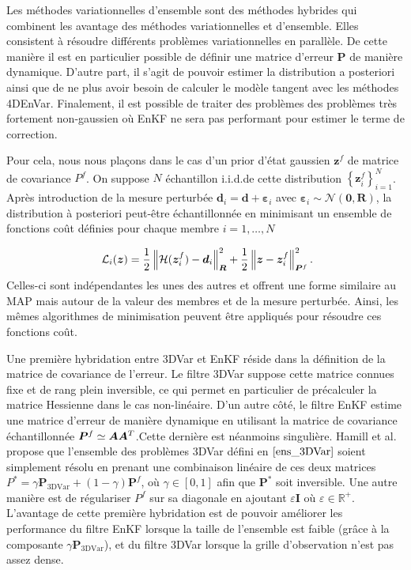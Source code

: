 Les méthodes variationnelles d'ensemble sont des méthodes hybrides qui combinent les avantage des méthodes variationnelles et d'ensemble. Elles consistent à résoudre différents problèmes variationnelles en parallèle. De cette manière il est en particulier possible de définir une matrice d'erreur $\bm P$ de manière dynamique. D'autre part, il s'agit de pouvoir estimer la distribution a posteriori ainsi que de ne plus avoir besoin de calculer le modèle tangent avec les méthodes 4DEnVar. Finalement, il est possible de traiter des problèmes des problèmes très fortement non-gaussien où EnKF ne sera pas performant pour estimer le terme de correction.

Pour cela, nous nous plaçons dans le cas d'un prior d'état gaussien $\bm z^f$ de matrice de covariance $P^f$. On suppose $N$ échantillon i.i.d.de cette distribution $\left\{\bm z^f_i\right\}_{i=1}^N$. Après introduction de la mesure perturbée $\bm d_i = \bm d + \bm \varepsilon_i$ avec $\bm \varepsilon_i \sim \mathcal{N}(\bm 0, \bm R)$, la distribution à posteriori peut-être échantillonnée en minimisant un ensemble de fonctions coût définies pour chaque membre $i = 1, \dots, N$

\begin{equation}~\label{ens_3DVar}
    \mathcal L_i(\bm z) = \frac12 \left\lVert \mathcal H (\bm z^f_i) - \bm d_i \right\rVert_{\bm R}^2 + \frac12 \left\lVert \bm z -\bm z^f_i \right\rVert^2_{\bm P^f}.
\end{equation}
Celles-ci sont indépendantes les unes des autres et offrent une forme similaire au MAP mais autour de la valeur des membres et de la mesure perturbée. Ainsi, les mêmes algorithmes de minimisation peuvent être appliqués pour résoudre ces fonctions coût.

Une première hybridation entre 3DVar et EnKF réside dans la définition de la matrice de covariance de l'erreur. Le filtre 3DVar suppose cette matrice connues fixe et de rang plein inversible, ce qui permet en particulier de précalculer la matrice Hessienne dans le cas non-linéaire. D'un autre côté, le filtre EnKF estime une matrice d'erreur de manière dynamique en utilisant la matrice de covariance échantillonnée $\bm P^f\simeq \bm A \bm A^T$.Cette dernière est néanmoins singulière. Hamill et al.~\cite{hamill_2020} propose que l'ensemble des problèmes 3DVar défini en $\ref{ens_3DVar}$ soient simplement résolu en prenant une combinaison linéaire de ces deux matrices $P^* = \gamma \bm P_{\text{3DVar}} + (1 - \gamma)\bm P^f$, où  $\gamma \in [0, 1]$ afin que $\bm P^*$ soit inversible. Une autre manière est de régulariser $P^f$ sur sa diagonale en ajoutant $\varepsilon \bm I$ où $\varepsilon \in \mathbb R^+$.
L'avantage de cette première hybridation est de pouvoir améliorer les performance du filtre EnKF lorsque la taille de l'ensemble est faible (grâce à la composante $\gamma \bm P_{\text{3DVar}}$), et du filtre 3DVar lorsque la grille d'observation n'est pas assez dense.

